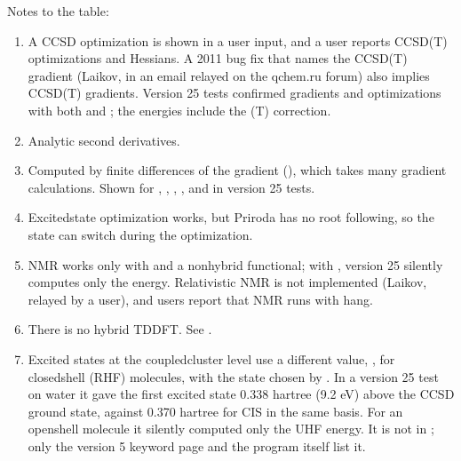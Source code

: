 \documentclass[letterpaper,10pt,english,openany,oneside]{sphinxmanual}
\begin{document}
\sphinxAtStartPar
Notes to the table:
\begin{enumerate}
%
\item {} 
\sphinxAtStartPar
A CCSD optimization is shown in a user input, and a user reports CCSD(T) optimizations and Hessians. A 2011 bug
fix that names the CCSD(T) gradient (Laikov, in an e\sphinxhyphen{}mail relayed on the qchem.ru forum) also implies CCSD(T)
gradients. Version 25 tests confirmed gradients and optimizations with both  and ; the 
energies include the (T) correction. 

\item {} 
\sphinxAtStartPar
Analytic second derivatives. 

\item {} 
\sphinxAtStartPar
Computed by finite differences of the gradient (), which takes
many gradient calculations. Shown for , , , ,  and  in version 25
tests. 

\item {} 
\sphinxAtStartPar
Excited\sphinxhyphen{}state optimization works, but Priroda has no root following, so the state can switch during the
optimization. 

\item {} 
\sphinxAtStartPar
NMR works only with  and a non\sphinxhyphen{}hybrid functional; with , version 25 silently computes only the
energy. Relativistic NMR is not implemented (Laikov, relayed by a user), and users report that NMR runs with
 hang. 

\item {} 
\sphinxAtStartPar
There is no hybrid TDDFT. See {\hyperref[\detokenize{start/about:what-priroda-does-not-do}]{}}.

\item {} 
\sphinxAtStartPar
Excited states at the coupled\sphinxhyphen{}cluster level use a different  value, , for closed\sphinxhyphen{}shell (RHF)
molecules, with the state chosen by . In a version 25 test on water it gave the first excited state 0.338
hartree (9.2 eV) above the CCSD ground state, against 0.370 hartree for CIS in the same basis. For an open\sphinxhyphen{}shell
molecule it silently computed only the UHF energy. It is not in ; only the version 5 keyword page and the
program itself list it. 


\end{enumerate}
\end{document}
